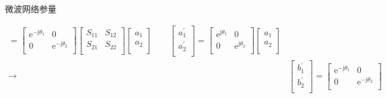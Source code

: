 \begin{frame}{微波网络参量}
\begin{enumerate}
\begin{align*}
                  =
                  \begin{bmatrix*}
                      \mathrm{e}^{-\mathrm{j}\theta_1} & 0 \\
                      0 & \mathrm{e}^{-\mathrm{j}\theta_2} \\
                  \end{bmatrix*}
                  \begin{bmatrix*}
                      S_{11} & S_{12} \\
                      S_{21} & S_{22} \\
                  \end{bmatrix*}
                  \begin{bmatrix*}
                      a_1 \\
                      a_2 \\
                  \end{bmatrix*}
                  \qquad
                  \begin{bmatrix*}
                      a_1^{'} \\
                      a_2^{'} \\
                  \end{bmatrix*}
                  =
                  \begin{bmatrix*}
                      \mathrm{e}^{\mathrm{j}\theta_1} & 0 \\
                      0 & \mathrm{e}^{\mathrm{j}\theta_2} \\
                  \end{bmatrix*}
                  \begin{bmatrix*}
                      a_1 \\
                      a_2 \\
                  \end{bmatrix*}    \\
                  \rightarrow
                   & \begin{bmatrix*}
                         b_1^{'} \\
                         b_2^{'} \\
                     \end{bmatrix*}
                  =
                  \begin{bmatrix*}
                      \mathrm{e}^{-\mathrm{j}\theta_1} & 0 \\
                      0 & \mathrm{e}^{-\mathrm{j}\theta_2} \\

\end{bmatrix*}
\end{align*}
\end{enumerate}
\end{frame}

